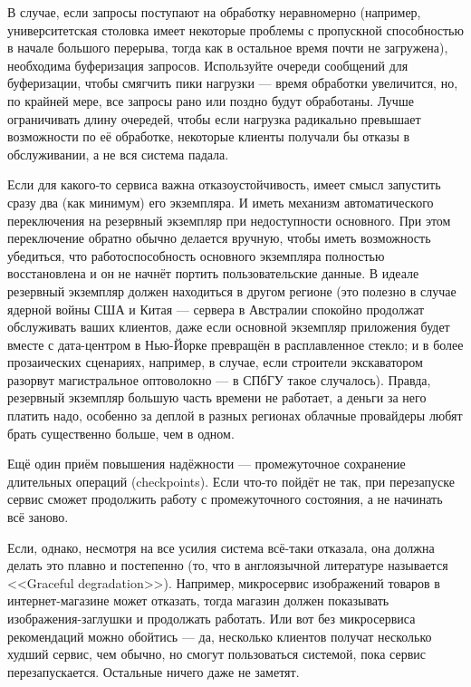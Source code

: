 \documentclass{../../text-style}
\begin{document}
В случае, если запросы поступают на обработку неравномерно (например, университетская столовка имеет некоторые проблемы с пропускной способностью в начале большого перерыва, тогда как в остальное время почти не загружена), необходима буферизация запросов. Используйте очереди сообщений для буферизации, чтобы смягчить пики нагрузки --- время обработки увеличится, но, по крайней мере, все запросы рано или поздно будут обработаны. Лучше ограничивать длину очередей, чтобы если нагрузка радикально превышает возможности по её обработке, некоторые клиенты получали бы отказы в обслуживании, а не вся система падала.

Если для какого-то сервиса важна отказоустойчивость, имеет смысл запустить сразу два (как минимум) его экземпляра. И иметь механизм автоматического переключения на резервный экземпляр при недоступности основного. При этом переключение обратно обычно делается вручную, чтобы иметь возможность убедиться, что работоспособность основного экземпляра полностью восстановлена и он не начнёт портить пользовательские данные. В идеале резервный экземпляр должен находиться в другом регионе (это полезно в случае ядерной войны США и Китая --- сервера в Австралии спокойно продолжат обслуживать ваших клиентов, даже если основной экземпляр приложения будет вместе с дата-центром в Нью-Йорке превращён в расплавленное стекло; и в более прозаических сценариях, например, в случае, если строители экскаватором разорвут магистральное оптоволокно --- в СПбГУ такое случалось). Правда, резервный экземпляр большую часть времени не работает, а деньги за него платить надо, особенно за деплой в разных регионах облачные провайдеры любят брать существенно больше, чем в одном.

Ещё один приём повышения надёжности --- промежуточное сохранение длительных операций (checkpoints). Если что-то пойдёт не так, при перезапуске сервис сможет продолжить работу с промежуточного состояния, а не начинать всё заново.

Если, однако, несмотря на все усилия система всё-таки отказала, она должна делать это плавно и постепенно (то, что в англоязычной литературе называется <<Graceful degradation>>). Например, микросервис изображений товаров в интернет-магазине может отказать, тогда магазин должен показывать изображения-заглушки и продолжать работать. Или вот без микросервиса рекомендаций можно обойтись --- да, несколько клиентов получат несколько худший сервис, чем обычно, но смогут пользоваться системой, пока сервис перезапускается. Остальные ничего даже не заметят.
\end{document}
